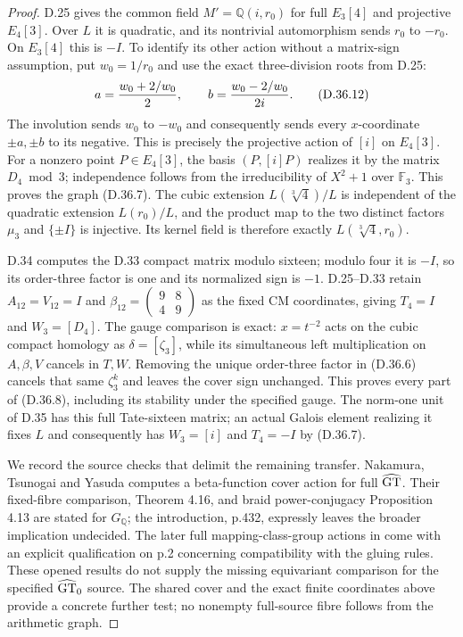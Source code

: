 \begin{proof}
D.25 gives the common field $M'=\mathbb Q(i,r_0)$ for full
$E_3[4]$ and projective $E_4[3]$. Over $L$ it is quadratic,
and its nontrivial automorphism sends $r_0$ to $-r_0$.
On $E_3[4]$ this is $-I$. To identify its other action without a
matrix-sign assumption, put $w_0=1/r_0$ and use the exact
three-division roots from D.25:
\[
 a={w_0+2/w_0\over2},\qquad
 b={w_0-2/w_0\over2i}.                                \tag{D.36.12}
\]
The involution sends $w_0$ to $-w_0$ and consequently sends every
$x$-coordinate $\pm a,\pm b$ to its negative. This is precisely
the projective action of $[i]$ on $E_4[3]$. For a nonzero point
$P\in E_4[3]$, the basis $(P,[i]P)$ realizes it by the matrix
$D_4\bmod3$; independence follows from the irreducibility of
$X^2+1$ over $\mathbb F_3$. This proves the graph (D.36.7).
The cubic extension $L(\sqrt[3]{4})/L$ is independent of the
quadratic extension $L(r_0)/L$, and the product map to the two
distinct factors $\mu_3$ and $\{\pm I\}$ is injective.
Its kernel field is therefore exactly $L(\sqrt[3]{4},r_0)$.

D.34 computes the D.33 compact matrix modulo sixteen; modulo four
it is $-I$, so its order-three factor is one and its normalized sign
is $-1$. D.25--D.33 retain $A_{12}=V_{12}=I$ and
$\beta_{12}=(\begin{smallmatrix}9&8\\4&9\end{smallmatrix})$
as the fixed CM coordinates, giving $T_4=I$ and
$W_3=[D_4]$. The gauge comparison is exact: $x=t^{-2}$ acts
on the cubic compact homology as $\delta=[\zeta_3]$, while its
simultaneous left multiplication on $A,\beta,V$ cancels in $T,W$.
Removing the unique order-three factor in (D.36.6) cancels that
same $\zeta_3^k$ and leaves the cover sign unchanged. This proves
every part of (D.36.8), including its stability under the specified
gauge. The norm-one unit of D.35 has this full Tate-sixteen matrix;
an actual Galois element realizing it fixes $L$ and consequently
has $W_3=[i]$ and $T_4=-I$ by (D.36.7).

We record the source checks that delimit the remaining transfer.
Nakamura, Tsunogai and Yasuda
\cite[Proposition 4.4]{dNTY2010} computes a beta-function cover
action for full $\widehat{\rm GT}$.
Their fixed-fibre comparison, Theorem 4.16, and braid
power-conjugacy Proposition 4.13 are stated for $G_{\mathbb Q}$;
the introduction, p.432, expressly leaves the broader implication
undecided. The later full mapping-class-group actions in
\cite[Theorem 1.1]{dLNS2026} come with an explicit qualification
on p.2 concerning compatibility with the gluing rules. These opened
results do not supply the missing equivariant comparison for the
specified $\widehat{\rm GT}_0$ source. The shared cover and the
exact finite coordinates above provide a concrete further test;
no nonempty full-source fibre follows from the arithmetic graph.
\end{proof}
